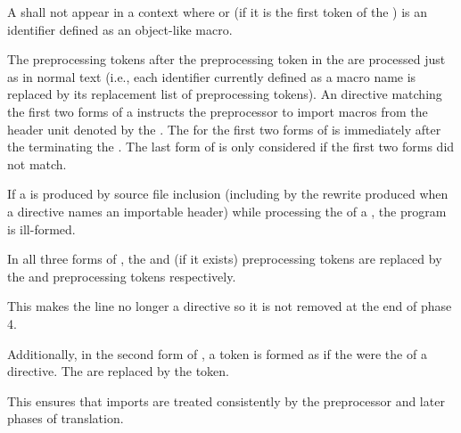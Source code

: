 \pnum
A  shall not
appear in a context where 
or (if it is the first token of the ) 
is an identifier defined as an object-like macro.

\pnum
The preprocessing tokens after the  preprocessing token
in the  
are processed just as in normal text
(i.e., each identifier currently defined as a macro name
is replaced by its replacement list of preprocessing tokens).
An  directive
matching the first two forms of a 
instructs the preprocessor to import macros
from the header unit
denoted by the .
%
The  for the
first two forms of  is
immediately after the  terminating
the .
The last form of  is only considered
if the first two forms did not match.

\pnum
If a  is produced by source file inclusion
(including by the rewrite produced
when a  directive names an importable header)
while processing the  of a ,
the program is ill-formed.

\pnum
In all three forms of ,
the  and  (if it exists) preprocessing tokens
are replaced by the  and
 preprocessing tokens respectively.
\begin{note}
This makes the line no longer a directive
so it is not removed at the end of phase 4.
\end{note}
Additionally, in the second form of ,
a  token is formed as if
the 
were the  of a  directive.
The  are replaced by
the  token.
\begin{note}
This ensures that imports are treated consistently by
the preprocessor and later phases of translation.
\end{note}

